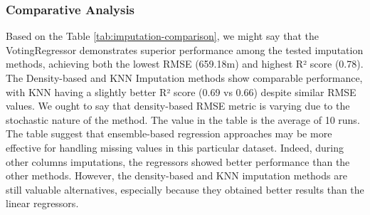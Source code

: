 \documentclass[a4paper, twoside]{article}
\begin{document}
\subsubsection{Comparative Analysis}

\begin{table}[ht]
\hspace{-0.03\textwidth}
\caption{Comparative analysis of different imputation methods}
\label{tab:imputation-comparison}
\end{table}
Based on the Table \ref{tab:imputation-comparison}, we might say that the VotingRegressor demonstrates superior performance among the tested imputation methods, achieving both the lowest RMSE (659.18m) and highest R² score (0.78). The Density-based and KNN Imputation methods show comparable performance, with KNN having a slightly better R² score (0.69 vs 0.66) despite similar RMSE values. We ought to say that density-based RMSE metric is varying due to the stochastic nature of the method. The value in the table is the average of 10 runs.
The table suggest that ensemble-based regression approaches may be more effective for handling missing values in this particular dataset. Indeed, during other columns imputations, the regressors showed better performance than the other methods. However, the density-based and KNN imputation methods are still valuable alternatives, especially because they obtained better results than the linear regressors.
\end{document}
